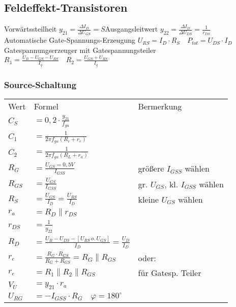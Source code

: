     \subsection{Feldeffekt-Transistoren}
    Vorwärtssteilheit $y_{21}=\frac{\Delta I_D}{\Delta U_{GS}}=S$\quad Ausgangsleitwert $y_{22}=\frac{\Delta I_D}{\Delta U_{DS}}=\frac{1}{r_{DS}}$\\
    Automatische Gate-Spannungs-Erzeugung $U_{RS}=I_D\cdot R_S\quad P_{tot}=U_{DS}\cdot I_D$\\
    Gatespannungserzeuger mit Gatespannungsteiler $R_1=\frac{U_B-U_{GS}-U_{RS}}{I_q}\quad R_2=\frac{U_{GS}+U_{RS}}{I_q}$
    \subsubsection{Source-Schaltung}
    \begin{minipage}{0.5\columnwidth}
        \renewcommand{\arraystretch}{1.01}
        \begin{table}[H]
            \begin{tabularx}{\columnwidth}{l l l}
                Wert & Formel & Bermerkung\\
                $C_S$ & $=0,2\cdot\frac{y_{21}}{f_{gu}}$ & \\ %
                $C_1$ & $=\frac{1}{2\pi f_{gu}(R_i+r_e)}$ & \\
                $C_2$ & $=\frac{1}{2\pi f_{gu}(R_L+r_a)}$ & \\
                $R_G$ & $=\frac{U_{GS}=0,5V}{I_{GSS}}$ & größere $I_{GSS}$ wählen \\
                $R_{GS}$ & $=\frac{U_{GS}}{I_{GSS}}$ & gr. $U_{GS}$, kl. $I_{GSS}$ wählen \\
                $R_S$ & $=\frac{U_{GS}}{I_D}=\frac{U_{RS}}{I_D}$ & kleine $U_{GS}$ wählen \\
                $r_a$ & $=R_D\parallel r_{DS}$ & \\
                $r_{DS}$ & $=\frac{1}{y_{22}}$ & \\
                $R_D$ & $=\frac{U_B-U_{DS}-[U_{RS}\, o.\, U_{GS}]}{I_D}=\frac{U_D}{I_D}$ & \\
                $r_e$ & $=\frac{R_G\cdot R_{GS}}{R_G+R_{GS}}=R_G\parallel R_{GS}$ & oder:\\
                $r_e$ & $=R_1\parallel R_2\parallel R_{GS}$ & für Gatesp. Teiler \\
                $V_U$ & $=y_{21}\cdot r_a$ & \\
                $U_{RG}$ & $=-I_{GSS}\cdot R_G\quad\varphi=180^{\circ}$ & \\ %
            \end{tabularx}
        \end{table}
    \end{minipage}
    \begin{minipage}{0.5\columnwidth}
        \vspace*{0.5cm}
    \end{minipage}

